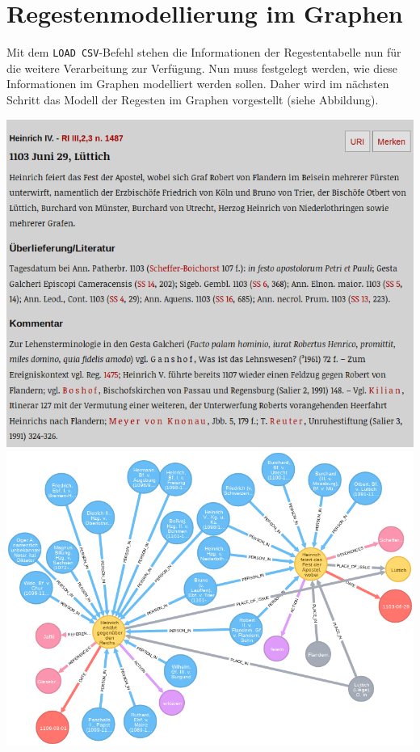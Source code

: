 \documentclass[ngerman,]{scrreprt}
\begin{document}
\section{Regestenmodellierung im Graphen}\label{regestenmodellierung-im-graphen}

Mit dem \texttt{LOAD\ CSV}-Befehl stehen die Informationen der Regestentabelle nun für die weitere Verarbeitung zur Verfügung. Nun muss festgelegt werden, wie diese Informationen im Graphen modelliert werden sollen. Daher wird im nächsten Schritt das Modell der Regesten im Graphen vorgestellt (siehe Abbildung).

\includegraphics{Bilder/RI2Graph/ReggH4-Nr-1487.png} \includegraphics{Bilder/RI2Graph/ReggH4-Nr-1487imGraph.png}
\end{document}
